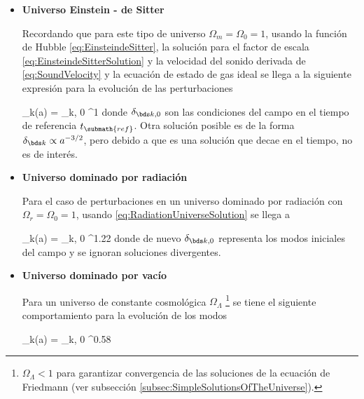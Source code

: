\begin{itemize}
\item \textbf{Universo Einstein - de Sitter}


Recordando que para este tipo de universo $\Omega_m = \Omega_0 = 1$, usando
la función de Hubble \ref{eq:EinsteindeSitter}, la solución para el factor 
de escala \ref{eq:EinsteindeSitterSolution} y la velocidad del sonido 
derivada de \ref{eq:SoundVelocity} y la ecuación de estado de gas ideal se 
llega a la siguiente expresión para la evolución de las perturbaciones


{ \delta_{\bds k}(a) = \delta_{\bds k, 0} ^{1} }
donde $\delta_{\bds k, 0}$ son las condiciones del campo en el tiempo de 
referencia $t_{\submath{ref}}$. Otra solución posible es de la forma
$\delta_{\bds k}\propto a^{-3/2}$, pero debido a que es una solución que
decae en el tiempo, no es de interés.


\item \textbf{Universo dominado por radiación}


Para el caso de perturbaciones en un universo dominado por radiación con
$\Omega_r = \Omega_0 = 1$, usando \ref{eq:RadiationUniverseSolution} se 
llega a


{ \delta_{\bds k}(a) = \delta_{\bds k, 0} ^{1.22} }
donde de nuevo $\delta_{\bds k, 0}$ representa los modos iniciales del 
campo y se ignoran soluciones divergentes.


\item \textbf{Universo dominado por vacío}
			

Para un universo de constante cosmológica $\Omega_\Lambda$
\footnote{$\Omega_\Lambda < 1 $ para garantizar convergencia de las soluciones
de la ecuación de Friedmann (ver subsección 
\ref{subsec:SimpleSolutionsOfTheUniverse}).}
se tiene el siguiente comportamiento para la evolución de los modos


{ \delta_{\bds k}(a) = \delta_{\bds k, 0} ^{0.58} }
\end{itemize}


